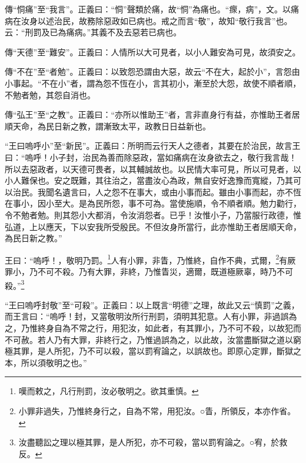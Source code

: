 {\noindent\zhuan{}\fzbyks 傳“恫痛”至“我言”。正義曰：“恫”聲類於痛，故“恫”為痛也。“瘝，病”，文。以痛病在汝身以述治民，故務除惡政如已病也。戒之而言“敬”，故知“敬行我言”也。云：“刑罰及已為痛病。”其義不及去惡若已病也。 \par}

{\noindent\zhuan{}\fzbyks 傳“天德”至“難安”。正義曰：人情所以大可見者，以小人難安為可見，故須安之。 \par}

{\noindent\zhuan{}\fzbyks 傳“不在”至“者勉”。正義曰：以致怨恐謂由大惡，故云“不在大，起於小”，言怨由小事起。“不在小”者，謂為怨不恆在小，言其初小，漸至於大怨，故使不順者順，不勉者勉，其怨自消也。 \par}

{\noindent\zhuan{}\fzbyks 傳“弘王”至“之教”。正義曰：“亦所以惟助王”者，言非直身行有益，亦惟助王者居順天命，為民日新之教，謂漸致太平，政教日日益新也。 \par}

{\noindent\shu{}\fzkt “王曰嗚呼小”至“新民”。正義曰：所明而云行天人之德者，其要在於治民，故言王曰：“嗚呼！小子封，治民為善而除惡政，當如痛病在汝身欲去之，敬行我言哉！所以去惡政者，以天德可畏者，以其輔誠故也。以民情大率可見，所以可見者，以小人難保也。安之既難，其往治之，當盡汝心為政，無自安好逸豫而寬縱，乃其可以治民。我聞名遺言曰，人之怨不在事大，或由小事而起。雖由小事而起，亦不恆在事小，因小至大。是為民所怨，事不可為。當使施順，令不順者順。勉力勸行，令不勉者勉。則其怨小大都消，令汝消怨者。已乎！汝惟小子，乃當服行政德，惟弘道，上以應天，下以安我所受殷民。不但汝身所當行，此亦惟助王者居順天命，為民日新之教。” \par}

王曰：“嗚呼！，敬明乃罰。\footnote{嘆而敕之，凡行刑罰，汝必敬明之。欲其重慎。}人有小罪，非眚，乃惟終，自作不典，式爾，\footnote{小罪非過失，乃惟終身行之，自為不常，用犯汝。○眚，所領反，本亦作省。}有厥罪小，乃不可不殺。乃有大罪，非終，乃惟眚災，適爾，既道極厥辜，時乃不可殺。”\footnote{汝盡聽訟之理以極其罪，是人所犯，亦不可殺，當以罰宥論之。○宥，於救反。}

{\noindent\shu{}\fzkt “王曰嗚呼封敬”至“可殺”。正義曰：以上既言“明德”之理，故此又云“慎罰”之義，而王言曰：“嗚呼！封，又當敬明汝所行刑罰，須明其犯意。人有小罪，非過誤為之，乃惟終身自為不常之行，用犯汝，如此者，有其罪小，乃不可不殺，以故犯而不可赦。若人乃有大罪，非終行之，乃惟過誤為之，以此故，汝當盡斷獄之道以窮極其罪，是人所犯，乃不可以殺，當以罰宥論之，以誤故也。即原心定罪，斷獄之本，所以須敬明之也。” \par}

